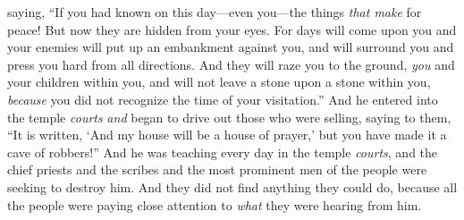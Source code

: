 \begin{biblechapter}
\verse saying, “If you had known on this day—even you—the things \textit{that make} for peace! But now they are hidden from your eyes.
\verse For days will come upon you and your enemies will put up an embankment against you, and will surround you and press you hard from all directions.
\verse And they will raze you to the ground, \textit{you} and your children within you, and will not leave a stone upon a stone within you, \textit{because} you did not recognize the time of your visitation.”
 And he entered into the temple \textit{courts} \textit{and} began to drive out those who were selling,
\verse saying to them, “It is written, ‘And my house will be a house of prayer,’ but you have made it a cave of robbers!”
\verse And he was teaching every day in the temple \textit{courts}, and the chief priests and the scribes and the most prominent men of the people were seeking to destroy him.
\verse And they did not find anything they could do, because all the people were paying close attention to \textit{what} they were hearing from him.
\end{biblechapter}

